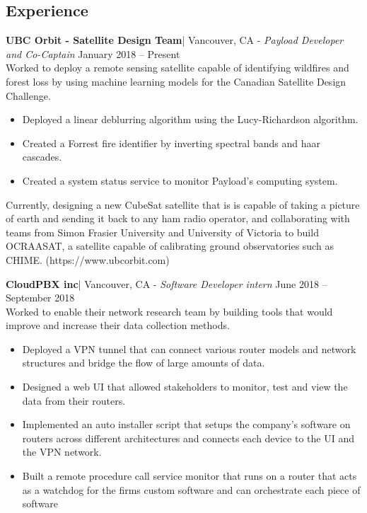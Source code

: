 \documentclass[letter]{res}
\begin{document}
\begin{resume}
\section{Experience}
\textbf{UBC Orbit - Satellite Design Team}| Vancouver, CA\newline 
 - {\sl Payload Developer and Co-Captain} \hfill January 2018 – Present\\
 Worked to deploy a remote sensing satellite capable of identifying wildfires and forest loss by using machine learning models for the Canadian Satellite Design Challenge.\\
 \vspace{-2mm}
 \begin{itemize}
 \item Deployed a linear deblurring algorithm using the Lucy-Richardson algorithm.
 \item Created a Forrest fire identifier by inverting spectral bands and haar cascades. 
 \item Created a system status service to monitor Payload's computing system. 
 \end{itemize}
 Currently, designing a new CubeSat satellite that is is capable of taking a picture of earth and sending it back to any ham radio operator, and collaborating with teams from Simon Frasier University and University of Victoria to build OCRAASAT, a satellite capable of calibrating ground observatories such as CHIME. (https://www.ubcorbit.com)

\textbf{CloudPBX inc}| Vancouver, CA \newline 
 - {\sl Software Developer intern} \hfill June 2018 – September 2018\\
Worked to enable their network research team by building tools that would improve and increase their data collection methods. \\
 \vspace{-2mm}
 \begin{itemize}
 \item Deployed a VPN tunnel that can connect various router models and network structures and bridge the flow of large amounts of data.
 \item Designed a web UI that allowed stakeholders to monitor, test and view the data from their routers.
 \item Implemented an auto installer script that setups the company's software on routers across different architectures and connects each device to the UI and the VPN network.
 \item Built a remote procedure call service monitor that runs on a router that acts as a watchdog for the firms custom software and can orchestrate each piece of software
 \end{itemize}


\end{resume}
\end{document}
